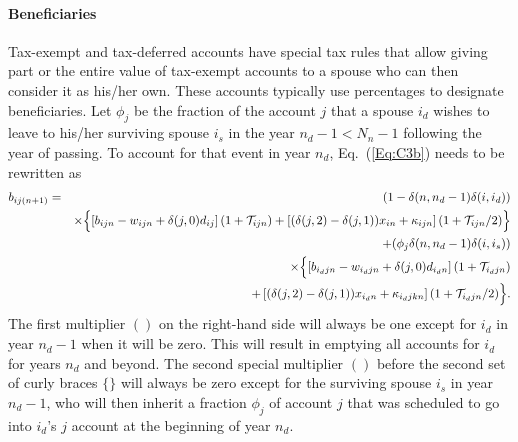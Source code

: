 \documentclass{report}[fleqn,11pt]
\begin{document}
\paragraph*{Beneficiaries}
Tax-exempt and tax-deferred accounts have special tax rules that allow giving part
or the entire value of
tax-exempt accounts to a spouse who can then consider it as his/her own.
These accounts typically use percentages to designate beneficiaries.
Let $\phi_j$ be the fraction of the account $j$ that a spouse $i_d$ wishes
to leave to his/her surviving spouse $i_s$
in the year $n_d  - 1 < N_n - 1$ following the year of passing. 
To account for that event in year $n_d$, Eq.~(\ref{Eq:C3b}) needs to be rewritten as
\begin{eqnarray}
	b_{ij(n+1)} &=& (1 - \delta(n, n_d-1)\delta(i, i_d)) \nonumber \\
	&&\times \Bigl\{\left[b_{ijn} - w_{ijn} + \delta(j, 0)d_{ij}\right](1 + \mathcal{T}_{ijn})
	+ \left[(\delta(j, 2) - \delta(j, 1))x_{in} + \kappa_{ijn}\right](1 + \mathcal{T}_{ijn}/2) 
	\Bigr\}\nonumber \\
	&& + (\phi_j\delta(n, n_d-1)\delta(i, i_s)) \nonumber  \\
	&& \times \Bigl\{\left[b_{i_djn} - w_{i_djn} + \delta(j, 0)d_{i_dn}\right](1 + \mathcal{T}_{i_djn})
	\nonumber\\
	&& + \left[(\delta(j, 2) - \delta(j, 1))x_{i_dn} + \kappa_{i_djkn}\right](1 + \mathcal{T}_{i_djn}/2) 
	\Bigr\}.
\end{eqnarray}
The first multiplier $()$ on the right-hand side will always be one except for $i_d$ in
year $n_d-1$ when it will be zero. This will result in emptying all accounts for $i_d$ for years
$n_d$ and beyond.
The second special multiplier $()$ before the second set of curly braces
$\{\}$ will always be zero except for the surviving
spouse $i_s$ in year $n_d-1$, who will then inherit a fraction $\phi_j$ of account $j$ that
was scheduled to go into $i_d$'s $j$ account at the beginning of year $n_d$.
\end{document}
